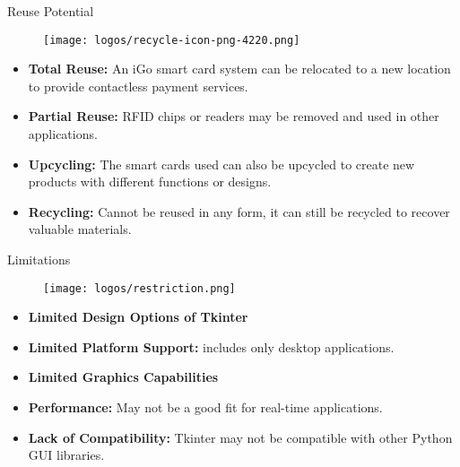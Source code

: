 \documentclass[final]{beamer}
\newlength{\onecolwid}
\newlength{\twocolwid}
\begin{document}
\begin{frame}[t]
\begin{columns}[t]
\begin{column}{\twocolwid}
\begin{columns}[t,totalwidth=\twocolwid]
\begin{column}{\onecolwid}\vspace{-.6in} %

\begin{block}{Reuse Potential}


\begin{figure}[h!]
  \centering
   \texttt{[image: logos/recycle-icon-png-4220.png]}
\end{figure}
\begin{alertblock} { }
    \begin{itemize}
        \item \textbf{Total Reuse:} An iGo smart card system can be relocated to a new location to provide contactless payment services.
        \item \textbf{Partial Reuse:} RFID chips or readers may be removed and used in other applications.
        \item \textbf{Upcycling:} The smart cards used can also be upcycled to create new products with different functions or designs.
        \item \textbf{Recycling:} Cannot be reused in any form, it can still be recycled to recover valuable materials.
    \end{itemize}
\end{alertblock}
\end{block}

\begin{block}{Limitations}

\begin{figure}[h!]
  \centering
   \texttt{[image: logos/restriction.png]}
\end{figure}
\begin{alertblock} { }
    \begin{itemize}
        \item \textbf{Limited Design Options of Tkinter}
        \item \textbf{Limited Platform Support:} includes only desktop applications.
        \item \textbf{Limited Graphics Capabilities}
        \item \textbf{Performance: } May not be a good fit for real-time applications.
        \item \textbf{Lack of Compatibility:} Tkinter may not be compatible with other Python GUI libraries.
    \end{itemize}
\end{alertblock}


\end{block}
\end{column}
\end{columns}
\end{column}
\end{columns}
\end{frame}
\end{document}
